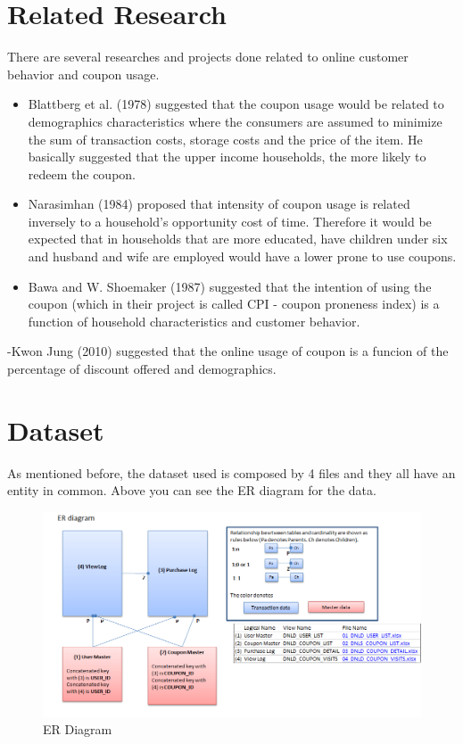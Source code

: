 \documentclass[]{article}
\begin{document}
\section{Related Research}\label{related-research}

There are several researches and projects done related to online
customer behavior and coupon usage.

\begin{itemize}
\item
  Blattberg et al. (1978) suggested that the coupon usage would be
  related to demographics characteristics where the consumers are
  assumed to minimize the sum of transaction costs, storage costs and
  the price of the item. He basically suggested that the upper income
  households, the more likely to redeem the coupon.
\item
  Narasimhan (1984) proposed that intensity of coupon usage is related
  inversely to a household's opportunity cost of time. Therefore it
  would be expected that in households that are more educated, have
  children under six and husband and wife are employed would have a
  lower prone to use coupons.
\item
  Bawa and W. Shoemaker (1987) suggested that the intention of using the
  coupon (which in their project is called CPI - coupon proneness index)
  is a function of household characteristics and customer behavior.
\end{itemize}

-Kwon Jung (2010) suggested that the online usage of coupon is a funcion
of the percentage of discount offered and demographics.

\section{Dataset}\label{dataset}

As mentioned before, the dataset used is composed by 4 files and they
all have an entity in common. Above you can see the ER diagram for the
data.

\begin{figure}[htbp]
\centering
\includegraphics{erdiagram.png}
\caption{ER Diagram}
\end{figure}
\end{document}
